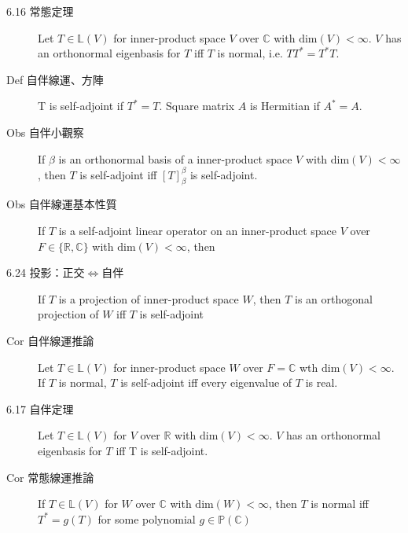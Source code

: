 \documentclass[9pt, twocolumn]{extarticle}
\newcommand{\vsdim}{\ensuremath{\text{dim}}}
\newcommand{\realnum}{\mathbb{R}}
\newcommand{\complexnum}{\mathbb{C}}
\newcommand{\ltrans}{\mathbb{L}}
\newcommand{\polynom}{\mathbb{P}}
\begin{document}
\begin{description}
    \item[6.16 常態定理] Let $T\in \ltrans(V)$ for inner-product space $V$ over $\complexnum$ with $\vsdim(V) < \infty$. $V$ has an orthonormal eigenbasis for $T$ iff $T$ is normal, i.e. $TT^*=T^*T$.
    \item[Def 自伴線運、方陣] T is self-adjoint if $T^* = T$. Square matrix $A$ is Hermitian if $A^*=A$.
    \item[Obs 自伴小觀察] If $\beta$ is an orthonormal basis of a inner-product space $V$ with $\vsdim(V) < \infty$, then $T$ is self-adjoint iff $[T]^\beta_\beta$ is self-adjoint.
    \item[Obs 自伴線運基本性質] If $T$ is a self-adjoint linear operator on an inner-product space $V$ over $F \in \{\realnum, \complexnum\}$ with $\vsdim(V)<\infty$, then
    \item[6.24 投影：正交$\Leftrightarrow$自伴] If $T$ is a projection of inner-product space $W$, then $T$ is an orthogonal projection of $W$ iff $T$ is self-adjoint
    \item[Cor 自伴線運推論] Let $T \in \ltrans(V)$ for inner-product space $W$ over $F = \complexnum$ wth $\vsdim(V) < \infty$. If $T$ is normal, $T$ is self-adjoint iff every eigenvalue of $T$ is real.
    \item[6.17 自伴定理] Let $T \in \ltrans(V)$ for $V$ over $\realnum$ with $\vsdim(V)<\infty$. $V$ has an orthonormal eigenbasis for $T$ iff T is self-adjoint.
    \item[Cor 常態線運推論] If $T\in \ltrans(V)$ for $W$ over $\complexnum$ with $\vsdim(W)< \infty$, then $T$ is normal iff $T^* = g(T)$ for some polynomial $g \in \polynom(\complexnum)$



\end{description}
\end{document}
